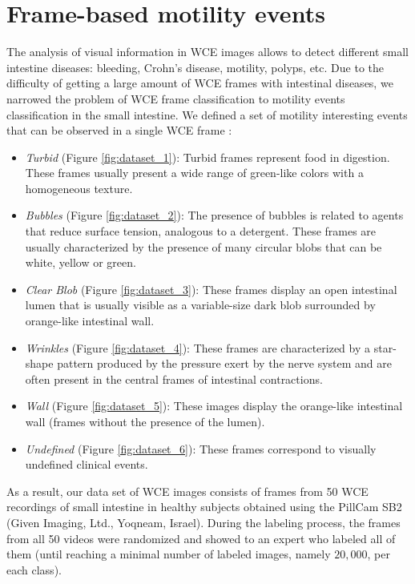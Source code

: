 \documentclass[review,12pt,3p]{elsarticle}
\begin{document}
\section{Frame-based motility events}

The analysis of visual information in WCE images allows to detect different small intestine diseases: bleeding, Crohn's disease, motility, polyps, etc. Due to the difficulty of getting a large amount of WCE frames with intestinal diseases, we narrowed the problem of WCE frame classification to motility events classification in the small intestine. We defined a set of motility interesting events that can be observed in a single WCE frame \cite{Malagelada2015}:
\begin{itemize}
\item \emph{Turbid} (Figure \ref{fig:dataset_1}): Turbid frames represent food in digestion. These frames usually present a wide range of green-like colors with a homogeneous texture. 
\item \emph{Bubbles} (Figure \ref{fig:dataset_2}): The presence of bubbles is related to agents that reduce surface tension, analogous to a detergent. These frames are usually characterized by the presence of many circular blobs that can be white, yellow or green. 
\item \emph{Clear Blob} (Figure \ref{fig:dataset_3}): These frames display an open intestinal lumen that is usually visible as a variable-size dark blob surrounded by orange-like intestinal wall.
\item \emph{Wrinkles} (Figure \ref{fig:dataset_4}): These frames are characterized by a star-shape pattern produced by the pressure exert by the nerve system and are often present in the central frames of intestinal contractions.
\item \emph{Wall} (Figure \ref{fig:dataset_5}): These images display the orange-like intestinal wall (frames without the presence of the lumen).  
\item \emph{Undefined} (Figure \ref{fig:dataset_6}): These frames correspond to visually undefined clinical events.
\end{itemize}


As a result, our data set of WCE images consists of frames from 50 WCE recordings of small intestine in healthy subjects obtained using the PillCam SB2 (Given Imaging, Ltd., Yoqneam, Israel). During the labeling process, the frames from all 50 videos were randomized and showed to an expert who labeled all of them (until reaching a minimal number of labeled images, namely $20,000$, per each class). 
\end{document}
